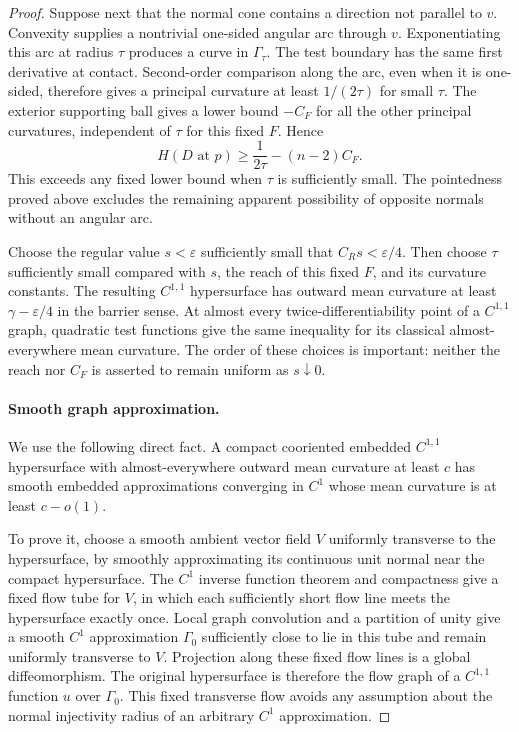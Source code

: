 \begin{proof}
Suppose next that the normal cone contains a direction not parallel
to $v$. Convexity supplies a nontrivial one-sided angular arc through
$v$. Exponentiating this arc at radius $\tau$ produces a curve in
$\Gamma_\tau$. The test boundary has the same first derivative at
contact. Second-order comparison along the arc, even when it is
one-sided, therefore gives a principal curvature at least
$1/(2\tau)$ for small $\tau$. The exterior supporting ball gives
a lower bound $-C_F$ for all the other principal curvatures,
independent of $\tau$ for this fixed $F$. Hence
\[
 H(D\text{ at }p)\ge\frac1{2\tau}-(n-2)C_F.
\]
This exceeds any fixed lower bound when $\tau$ is sufficiently
small. The pointedness proved above excludes the remaining apparent
possibility of opposite normals without an angular arc.

Choose the regular value $s<\varepsilon$ sufficiently small that
$C_Rs<\varepsilon/4$. Then choose $\tau$ sufficiently small compared
with $s$, the reach of this fixed $F$, and its curvature constants.
The resulting $C^{1,1}$ hypersurface has outward mean curvature at
least $\gamma-\varepsilon/4$ in the barrier sense. At almost every
twice-differentiability point of a $C^{1,1}$ graph, quadratic test
functions give the same inequality for its classical almost-everywhere
mean curvature. The order of these choices is important: neither
the reach nor $C_F$ is asserted to remain uniform as $s\downarrow0$.

\paragraph{Smooth graph approximation.}
We use the following direct fact. A compact cooriented embedded
$C^{1,1}$ hypersurface with almost-everywhere outward mean curvature
at least $c$ has smooth embedded approximations converging in $C^1$
whose mean curvature is at least $c-o(1)$.

To prove it, choose a smooth ambient vector field $V$ uniformly
transverse to the hypersurface, by smoothly approximating its
continuous unit normal near the compact hypersurface. The $C^1$
inverse function theorem and compactness give a fixed flow tube for
$V$, in which each sufficiently short flow line meets the hypersurface
exactly once. Local graph convolution and a partition of unity give
a smooth $C^1$ approximation $\Gamma_0$ sufficiently close to lie in
this tube and remain uniformly transverse to $V$. Projection along
these fixed flow lines is a global diffeomorphism. The original
hypersurface is therefore the flow graph of a $C^{1,1}$ function
$u$ over $\Gamma_0$. This fixed transverse flow avoids any assumption
about the normal injectivity radius of an arbitrary $C^1$ approximation.


\end{proof}
